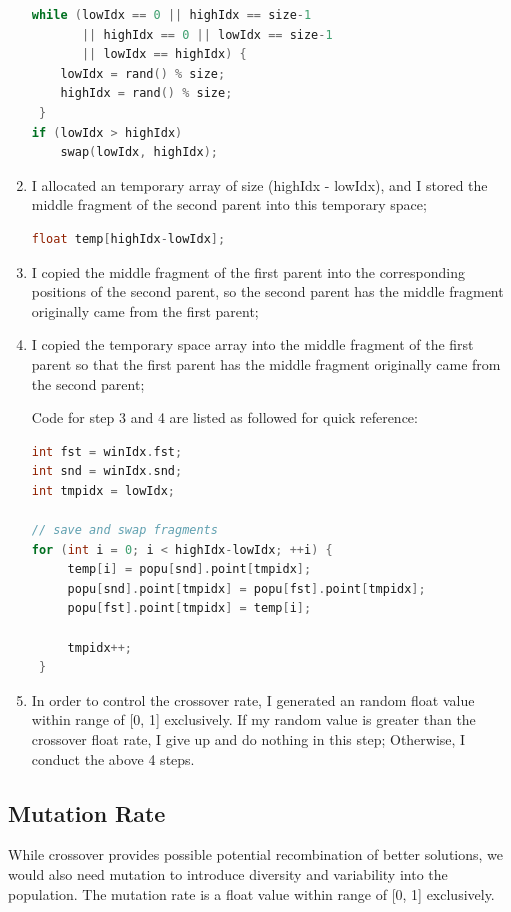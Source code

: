 \documentclass[b5paper,11pt, abstraction, titlepage]{scrartcl}
\begin{document}
\begin{CJK}{UTF8}{gbsn}
\begin{enumerate}
\begin{lstlisting}[language=c++]
while (lowIdx == 0 || highIdx == size-1
       || highIdx == 0 || lowIdx == size-1
       || lowIdx == highIdx) {    
    lowIdx = rand() % size;
    highIdx = rand() % size;
 }
if (lowIdx > highIdx)
    swap(lowIdx, highIdx);
\end{lstlisting}
\item I allocated an temporary array of size (highIdx - lowIdx), and I stored the middle fragment of the second parent into this temporary space;
\begin{lstlisting}[language=c++]
float temp[highIdx-lowIdx];
\end{lstlisting}
\item I copied the middle fragment of the first parent into the corresponding positions of the second parent, so the second parent has the middle fragment originally came from the first parent;
\item I copied the temporary space array into the middle fragment of the first parent so that the first parent has the middle fragment originally came from the second parent;

  Code for step 3 and 4 are listed as followed for quick reference:
\begin{lstlisting}[language=c++]
int fst = winIdx.fst;
int snd = winIdx.snd;
int tmpidx = lowIdx;

// save and swap fragments 
for (int i = 0; i < highIdx-lowIdx; ++i) { 
     temp[i] = popu[snd].point[tmpidx];
     popu[snd].point[tmpidx] = popu[fst].point[tmpidx];
     popu[fst].point[tmpidx] = temp[i];
        
     tmpidx++;
 }
\end{lstlisting}
  
\item In order to control the crossover rate, I generated an random float value within range of [0, 1] exclusively. If my random value is greater than the crossover float rate, I give up and do nothing in this step; Otherwise, I conduct the above 4 steps.
\end{enumerate}


\subsection{Mutation Rate}
While crossover provides possible potential recombination of better solutions, we would also need mutation to introduce diversity and variability into the population. The mutation rate is a float value within range of [0, 1] exclusively.


\end{CJK}
\end{document}
